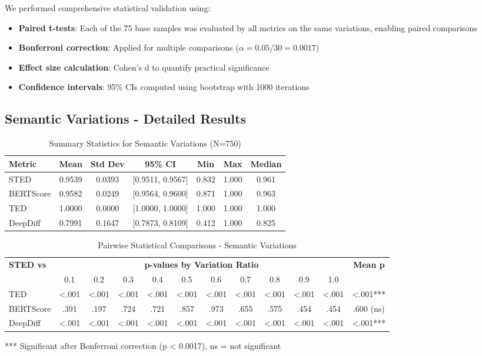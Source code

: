 \documentclass{article}
\begin{document}
We performed comprehensive statistical validation using:
\begin{itemize}
\item \textbf{Paired t-tests}: Each of the 75 base samples was evaluated by all metrics on the same variations, enabling paired comparisons
\item \textbf{Bonferroni correction}: Applied for multiple comparisons ($\alpha = 0.05/30 = 0.0017$)
\item \textbf{Effect size calculation}: Cohen's d to quantify practical significance
\item \textbf{Confidence intervals}: 95\% CIs computed using bootstrap with 1000 iterations
\end{itemize}

\subsection{Semantic Variations - Detailed Results}

\begin{table}[H]
\centering
\caption{Summary Statistics for Semantic Variations (N=750)}
\label{tab:semantic-stats-detailed}
\begin{tabular}{lcccccc}
\toprule
\textbf{Metric} & \textbf{Mean} & \textbf{Std Dev} & \textbf{95\% CI} & \textbf{Min} & \textbf{Max} & \textbf{Median} \\
\midrule
STED & 0.9539 & 0.0393 & [0.9511, 0.9567] & 0.832 & 1.000 & 0.961 \\
BERTScore & 0.9582 & 0.0249 & [0.9564, 0.9600] & 0.871 & 1.000 & 0.963 \\
TED & 1.0000 & 0.0000 & [1.0000, 1.0000] & 1.000 & 1.000 & 1.000 \\
DeepDiff & 0.7991 & 0.1647 & [0.7873, 0.8109] & 0.412 & 1.000 & 0.825 \\
\bottomrule
\end{tabular}
\end{table}

\begin{table}[H]
\centering
\caption{Pairwise Statistical Comparisons - Semantic Variations}
\label{tab:semantic-pairwise}
\small
\begin{tabular}{lccccccccccc}
\toprule
\textbf{STED vs} & \multicolumn{10}{c}{\textbf{p-values by Variation Ratio}} & \textbf{Mean p} \\
\cmidrule{2-11}
& 0.1 & 0.2 & 0.3 & 0.4 & 0.5 & 0.6 & 0.7 & 0.8 & 0.9 & 1.0 & \\
\midrule
TED & <.001 & <.001 & <.001 & <.001 & <.001 & <.001 & <.001 & <.001 & <.001 & <.001 & <.001*** \\
BERTScore & .391 & .197 & .724 & .721 & .857 & .973 & .655 & .575 & .454 & .454 & .600 (ns) \\
DeepDiff & <.001 & <.001 & <.001 & <.001 & <.001 & <.001 & <.001 & <.001 & <.001 & <.001 & <.001*** \\
\bottomrule
\end{tabular}
\vspace{0.3em}
\small{*** Significant after Bonferroni correction (p < 0.0017), ns = not significant}
\end{table}
\end{document}
